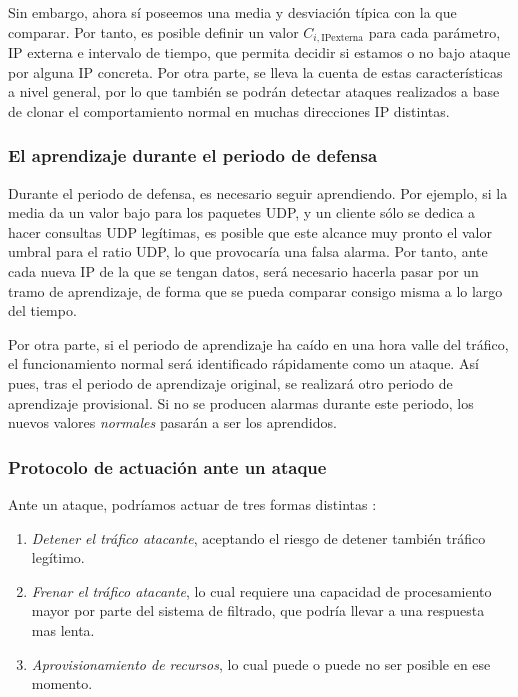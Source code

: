 Sin embargo, ahora sí poseemos una media y desviación típica con la que comparar. Por tanto, es posible definir un 
valor $C_{i,\text{IPexterna}}$ para cada parámetro, IP externa e intervalo de tiempo, que permita decidir si estamos o 
no bajo ataque por alguna IP concreta. Por otra parte, se lleva la cuenta de estas características a nivel general, por 
lo que también se podrán detectar ataques realizados a base de clonar el comportamiento normal en muchas direcciones 
\gls{IP} distintas.

\subsubsection{El aprendizaje durante el periodo de defensa}

Durante el periodo de defensa, es necesario seguir aprendiendo. Por ejemplo, si la media da un valor bajo para los 
paquetes \gls{UDP}, y un cliente sólo se dedica a hacer consultas \gls{UDP} legítimas, es posible que este alcance muy 
pronto el valor umbral para el ratio \gls{UDP}, lo que provocaría una falsa alarma. Por tanto, ante cada nueva IP de la 
que se tengan datos, será necesario hacerla pasar por un tramo de aprendizaje, de forma que se pueda comparar consigo 
misma a lo largo del tiempo.

Por otra parte, si el periodo de aprendizaje ha caído en una hora valle del tráfico, el funcionamiento normal será 
identificado rápidamente como un ataque. Así pues, tras el periodo de aprendizaje original, se realizará otro periodo 
de aprendizaje provisional. Si no se producen alarmas durante este periodo, los nuevos valores \emph{normales} pasarán 
a ser los aprendidos.

\subsubsection{Protocolo de actuación ante un ataque}

Ante un ataque, podríamos actuar de tres formas distintas \cite{Raghavan}:
\begin{enumerate}
 \item\emph{Detener el tráfico atacante}, aceptando el riesgo de detener también tráfico legítimo.
 \item\emph{Frenar el tráfico atacante}, lo cual requiere una capacidad de procesamiento mayor por parte del sistema de 
filtrado, que podría llevar a una respuesta mas lenta.
 \item\emph{Aprovisionamiento de recursos}, lo cual puede o puede no ser posible en ese momento.
\end{enumerate}

